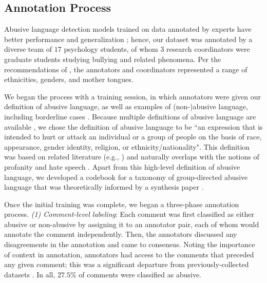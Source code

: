 \documentclass[letterpaper]{article}
\begin{document}
\subsection{Annotation Process}

Abusive language detection models trained on data annotated by experts have better performance and generalization \cite{waseem2016you};
hence, our dataset was annotated by a diverse team of  $17$ psychology students, of whom $3$ research coordinators were graduate students studying bullying and related phenomena.
Per the recommendations of \cite{vidgen2019challenges}, the annotators and coordinators represented a range of ethnicities, genders, and mother tongues.

We began the process with a training session, in which annotators were given our definition of abusive language, as well as examples of (non-)abusive language, including borderline cases \cite{vidgen2019challenges}.
Because multiple definitions of abusive language are available \cite{fortuna2018survey,peter2018cyberbullying}, we chose the definition of abusive language to be ``an expression that is
intended to hurt or attack an individual or a group of people on the basis of race, appearance, gender identity, religion, or ethnicity/nationality".
This definition was based on related literature (e.g., \cite{nobata2016abusive}) and naturally overlaps with the notions of profanity and hate speech \cite{nockleby2000hate}.
Apart from this high-level definition of abusive language, we developed a  codebook for a taxonomy of group-directed abusive language that was theoretically informed by a synthesis paper \cite{patchin2015measuring}.

Once the initial training was complete, we began a three-phase annotation process.
\textit{(1) Comment-level labeling}: Each comment was first classified as either abusive or non-abusive by
assigning it to an annotator pair, each of whom would annotate the comment independently.
Then, the annotators discussed any disagreements in the annotation and came to consensus.
Noting the importance of context in annotation, annotators had access to the comments that preceded any given comment; this was a significant departure from previously-collected datasets \cite{vidgen2019challenges}.  In all, $27.5\%$ of comments were classified as abusive.
\end{document}
